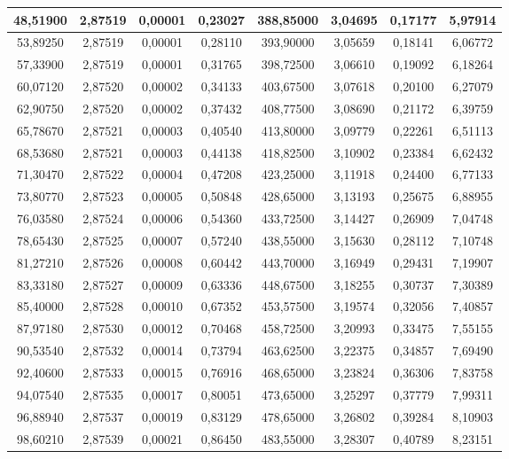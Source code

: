 \documentclass[a4paper,12pt]{article}
\numberwithin{equation}{section}
\begin{document}
\begin{appendices}
\begin{longtable}[c]{|c|c|c|c|c|c|c|c|}
48,51900	&	2,87519	&	0,00001	&	0,23027	&	388,85000	&	3,04695	&	0,17177	&	5,97914	\\\hline
53,89250	&	2,87519	&	0,00001	&	0,28110	&	393,90000	&	3,05659	&	0,18141	&	6,06772	\\\hline
57,33900	&	2,87519	&	0,00001	&	0,31765	&	398,72500	&	3,06610	&	0,19092	&	6,18264	\\\hline
60,07120	&	2,87520	&	0,00002	&	0,34133	&	403,67500	&	3,07618	&	0,20100	&	6,27079	\\\hline
62,90750	&	2,87520	&	0,00002	&	0,37432	&	408,77500	&	3,08690	&	0,21172	&	6,39759	\\\hline
65,78670	&	2,87521	&	0,00003	&	0,40540	&	413,80000	&	3,09779	&	0,22261	&	6,51113	\\\hline
68,53680	&	2,87521	&	0,00003	&	0,44138	&	418,82500	&	3,10902	&	0,23384	&	6,62432	\\\hline
71,30470	&	2,87522	&	0,00004	&	0,47208	&	423,25000	&	3,11918	&	0,24400	&	6,77133	\\\hline
73,80770	&	2,87523	&	0,00005	&	0,50848	&	428,65000	&	3,13193	&	0,25675	&	6,88955	\\\hline
76,03580	&	2,87524	&	0,00006	&	0,54360	&	433,72500	&	3,14427	&	0,26909	&	7,04748	\\\hline
78,65430	&	2,87525	&	0,00007	&	0,57240	&	438,55000	&	3,15630	&	0,28112	&	7,10748	\\\hline
81,27210	&	2,87526	&	0,00008	&	0,60442	&	443,70000	&	3,16949	&	0,29431	&	7,19907	\\\hline
83,33180	&	2,87527	&	0,00009	&	0,63336	&	448,67500	&	3,18255	&	0,30737	&	7,30389	\\\hline
85,40000	&	2,87528	&	0,00010	&	0,67352	&	453,57500	&	3,19574	&	0,32056	&	7,40857	\\\hline
87,97180	&	2,87530	&	0,00012	&	0,70468	&	458,72500	&	3,20993	&	0,33475	&	7,55155	\\\hline
90,53540	&	2,87532	&	0,00014	&	0,73794	&	463,62500	&	3,22375	&	0,34857	&	7,69490	\\\hline
92,40600	&	2,87533	&	0,00015	&	0,76916	&	468,65000	&	3,23824	&	0,36306	&	7,83758	\\\hline
94,07540	&	2,87535	&	0,00017	&	0,80051	&	473,65000	&	3,25297	&	0,37779	&	7,99311	\\\hline
96,88940	&	2,87537	&	0,00019	&	0,83129	&	478,65000	&	3,26802	&	0,39284	&	8,10903	\\\hline
98,60210	&	2,87539	&	0,00021	&	0,86450	&	483,55000	&	3,28307	&	0,40789	&	8,23151	\\\hline

\end{longtable}
\end{appendices}
\end{document}

